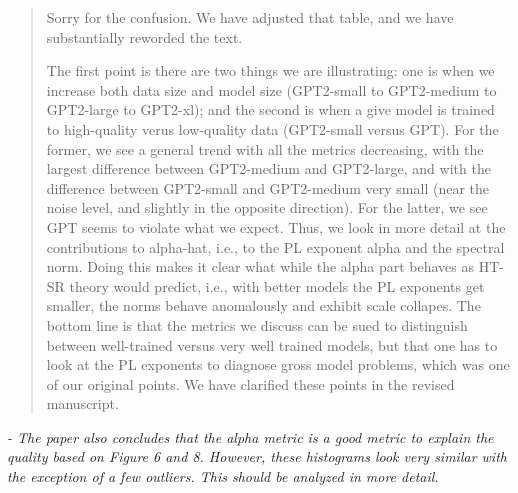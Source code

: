 \documentclass[11pt]{article}
\begin{document}
\begin{quote}
Sorry for the confusion.
We have adjusted that table, and we have substantially reworded the text.

The first point is there are two things we are illustrating: one is when we increase both data size and model size (GPT2-small to GPT2-medium to GPT2-large to GPT2-xl); and the second is when a give model is trained to high-quality verus low-quality data (GPT2-small versus GPT).
For the former, we see a general trend with all the metrics decreasing, with the largest difference between GPT2-medium and GPT2-large, and with the difference between GPT2-small and GPT2-medium very small (near the noise level, and slightly in the opposite direction).
For the latter, we see GPT seems to violate what we expect. 
Thus, we look in more detail at the contributions to alpha-hat, i.e., to the PL exponent alpha and the spectral norm.
Doing this makes it clear what while the alpha part behaves as HT-SR theory would predict, i.e., with better models the PL exponents get smaller, the norms behave anomalously and exhibit scale collapes.
The bottom line is that the metrics we discuss can be sued to distinguish between well-trained versus very well trained models, but that one has to look at the PL exponents to diagnose gross model problems, which was one of our original points.
We have clarified these points
in the revised manuscript.

\end{quote}

\noindent
\emph{%
- The paper also concludes that the alpha metric is a good metric to explain the quality based on Figure 6 and 8. However, these histograms look very similar with the exception of a few outliers. This should be analyzed in more detail.
}
\end{document}
